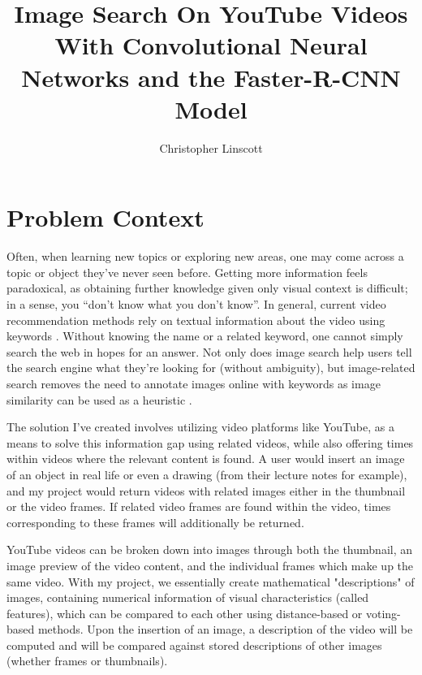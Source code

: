 \documentclass[10pt,twocolumn]{article}
\title{Image Search On YouTube Videos With Convolutional Neural Networks and the Faster-R-CNN Model}
\author{Christopher Linscott}
\affiliation{Occidental College}
\begin{document}
\maketitle


\section{Problem Context}

Often, when learning new topics or exploring new areas, one may come across a topic or object they’ve never seen before. Getting more information feels paradoxical, as obtaining further knowledge given only visual context is difficult; in a sense, you “don’t know what you don’t know”. In general, current video recommendation methods rely on textual information about the video using keywords \cite{Stanford2021}. Without knowing the name or a related keyword, one cannot simply search the web in hopes for an answer. Not only does image search help users tell the search engine what they’re looking for (without ambiguity), but image-related search removes the need to annotate images online with keywords as image similarity can be used as a heuristic \cite{Adrakatti2016}.

The solution I've created involves utilizing video platforms like YouTube, as a means to solve this information gap using related videos, while also offering times within videos where the relevant content is found. A user would insert an image of an object in real life or even a drawing (from their lecture notes for example), and my project would return videos with related images either in the thumbnail or the video frames. If related video frames are found within the video, times corresponding to these frames will additionally be returned.

YouTube videos can be broken down into images through both the thumbnail, an image preview of the video content, and the individual frames which make up the same video. With my project, we essentially create mathematical "descriptions" of images, containing numerical information of visual characteristics (called features), which can be compared to each other using distance-based or voting-based methods. 
Upon the insertion of an image, a description of the video will be computed and will be compared against stored descriptions of other images (whether frames or thumbnails).
\end{document}
